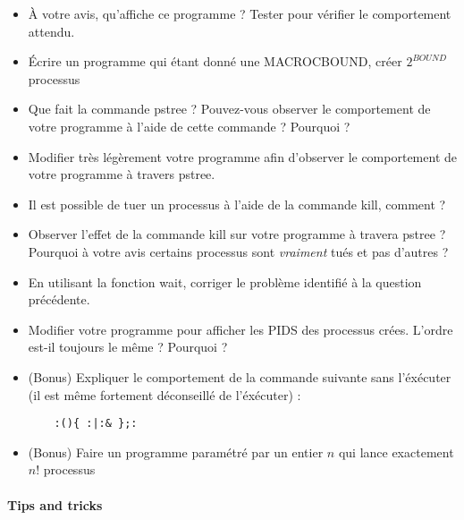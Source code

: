 \documentclass[11pt]{article}
\begin{document}
\begin{itemize}
\item À votre avis, qu'affiche ce programme ? Tester pour vérifier le comportement attendu.
\item Écrire un programme qui étant donné une MACRO{C}{BOUND}, créer \(2^{BOUND}\) processus
\item Que fait la commande {pstree} ? Pouvez-vous observer le comportement de votre programme à l'aide de cette commande ? Pourquoi ?
\item Modifier très légèrement votre programme afin d'observer le comportement de votre programme à travers {pstree}.
\item Il est possible de tuer un processus à l'aide de la commande {kill}, comment ?
\item Observer l'effet de la commande {kill} sur votre programme à travera {pstree} ? Pourquoi à votre avis certains processus sont \textit{vraiment} tués et pas d'autres ?
\item En utilisant la fonction {wait}, corriger le problème identifié à la question précédente.
\item Modifier votre programme pour afficher les PIDS des processus crées. L'ordre est-il toujours le même ? Pourquoi ?
\item (Bonus) Expliquer le comportement de la commande suivante sans l'éxécuter (il est même fortement déconseillé de l'éxécuter) :
  \begin{verbatim}
    :(){ :|:& };:
  \end{verbatim}
\item (Bonus) Faire un programme paramétré par un entier \(n\) qui lance exactement \(n!\) processus
\end{itemize}

\paragraph{Tips and tricks}
\end{document}
